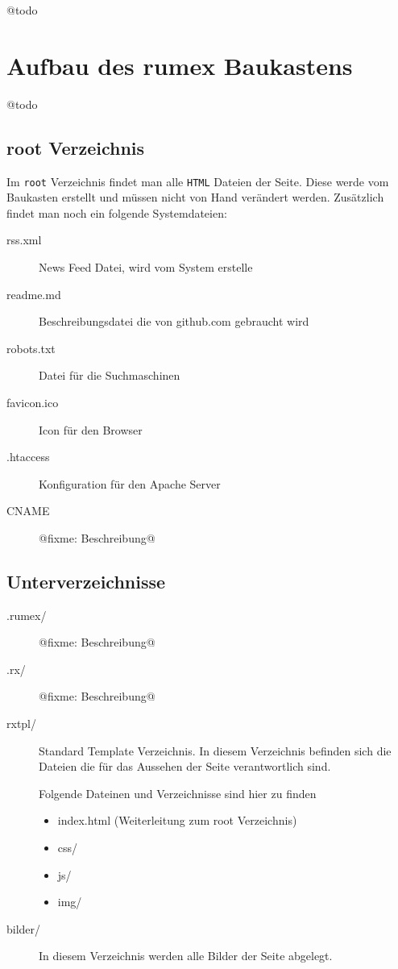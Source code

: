 \documentclass[%
fontsize=12pt,%
parskip=half,%
version=last%
]{scrreprt}
\begin{document}
@todo

\section{Aufbau des rumex Baukastens}\label{aufbau-des-rumex-baukastens}

@todo

\subsection{root Verzeichnis}\label{root-verzeichnis}

Im \texttt{root} Verzeichnis findet man alle \texttt{HTML} Dateien der
Seite. Diese werde vom Baukasten erstellt und müssen nicht von Hand
verändert werden. Zusätzlich findet man noch ein folgende Systemdateien:

\begin{description}
\item[rss.xml]
News Feed Datei, wird vom System erstelle
\item[readme.md]
Beschreibungsdatei die von github.com gebraucht wird
\item[robots.txt]
Datei für die Suchmaschinen
\item[favicon.ico]
Icon für den Browser
\item[.htaccess]
Konfiguration für den Apache Server
\item[CNAME]
@fixme: Beschreibung@
\end{description}

\subsection{Unterverzeichnisse}\label{unterverzeichnisse}

\begin{description}
\item[.rumex/]
@fixme: Beschreibung@
\item[.rx/]
@fixme: Beschreibung@
\item[rxtpl/]
Standard Template Verzeichnis. In diesem Verzeichnis befinden sich die
Dateien die für das Aussehen der Seite verantwortlich sind.

Folgende Dateinen und Verzeichnisse sind hier zu finden

\begin{itemize}
\itemsep1pt\parskip0pt
\item
  index.html (Weiterleitung zum root Verzeichnis)
\item
  css/\\
\item
  js/
\item
  img/
\end{itemize}
\item[bilder/]
In diesem Verzeichnis werden alle Bilder der Seite abgelegt.
\end{description}
\end{document}
